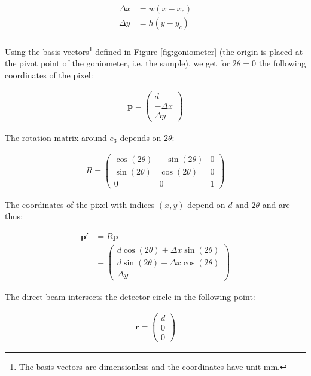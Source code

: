 \documentclass[a4paper, 12pt, twoside]{scrartcl}
\begin{document}
\begin{align*}
	\Delta x &= w(x - x_c) \\
	\Delta y &= h(y - y_c) \\
\end{align*}

Using the basis vectors\footnote{The basis vectors are dimensionless and the coordinates have unit $ \mathrm{mm} $.} defined in Figure \ref{fig:goniometer} (the origin is placed at the pivot point of the goniometer, i.e. the sample), we get for $ 2\theta = 0 $ the following coordinates of the pixel:

\begin{align*}
  \boldsymbol{p} = \begin{pmatrix} d \\ -\Delta x \\ \Delta y \end{pmatrix}	
\end{align*}

The rotation matrix around $ e_3 $ depends on $ 2\theta $:

\begin{align*}
	R = \begin{pmatrix}
		    \cos(2\theta) & -\sin(2\theta) & 0 \\
		    \sin(2\theta) & \cos(2\theta)  & 0 \\
		    0 & 0 & 1
		\end{pmatrix}
\end{align*}

The coordinates of the pixel with indices $ (x, y) $ depend on $ d $ and $ 2\theta $ and are thus:

\begin{align*}
	\boldsymbol{p'} &= R \boldsymbol{p} \\
	 &=
	\begin{pmatrix}
	d \cos(2\theta) + \Delta x \sin(2\theta) \\
	d \sin(2\theta) - \Delta x \cos(2\theta) \\
	\Delta y
	\end{pmatrix}
\end{align*}

The direct beam intersects the detector circle in the following point:

\begin{align*}
	\boldsymbol{r} = \begin{pmatrix} d \\ 0 \\ 0 \end{pmatrix}
\end{align*}
\end{document}
